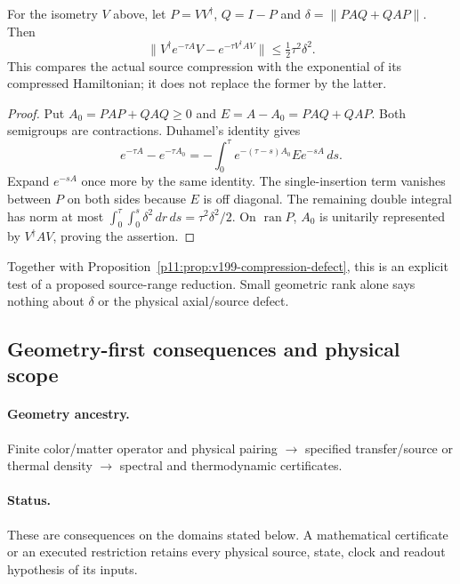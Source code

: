 \documentclass[12pt,a4paper]{article}
\begin{document}
\begin{proposition}
\label{p11:prop:v2210-lit-semigroup-leakage}
For the isometry $V$ above, let $P=VV^\dagger$, $Q=I-P$ and
$\delta=\|PAQ+QAP\|$. Then
\[
 \boxed{\|V^\dagger e^{-\tau A}V
       -e^{-\tau V^\dagger AV}\|\le\tfrac12\tau^2\delta^2.}
\]
This compares the actual source compression with the exponential of its
compressed Hamiltonian; it does not replace the former by the latter.
\end{proposition}
\begin{proof}
Put $A_0=PAP+QAQ\ge0$ and $E=A-A_0=PAQ+QAP$.
Both semigroups are contractions. Duhamel's identity gives
\[
 e^{-\tau A}-e^{-\tau A_0}
 =-\int_0^\tau e^{-(\tau-s)A_0}Ee^{-sA}\,ds.
\]
Expand $e^{-sA}$ once more by the same identity. The single-insertion term
vanishes between $P$ on both sides because $E$ is off diagonal. The
remaining double integral has norm at most
$\int_0^\tau\int_0^s\delta^2\,dr\,ds=\tau^2\delta^2/2$.
On $\operatorname{ran}P$, $A_0$ is unitarily represented by
$V^\dagger AV$, proving the assertion.
\end{proof}
Together with Proposition~\ref{p11:prop:v199-compression-defect}, this is an
explicit test of a proposed source-range reduction. Small geometric rank
alone says nothing about $\delta$ or the physical axial/source defect.


\subsection{Geometry-first consequences and physical scope}
\label{p11:sec:v2201-geometry-first-consequences}
\paragraph{Geometry ancestry.}
Finite color/matter operator and physical pairing $\to$ specified transfer/source or thermal density $\to$ spectral and thermodynamic certificates.
\paragraph{Status.}
These are consequences on the domains stated below.
A mathematical certificate or an executed restriction retains every
physical source, state, clock and readout hypothesis of its inputs.


\end{document}
